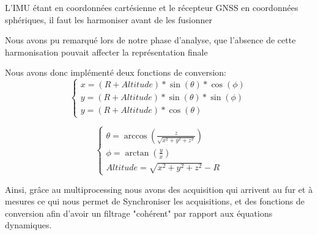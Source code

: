 L'IMU étant en coordonnées cartésienne et le récepteur GNSS en coordonnées sphériques, il faut les harmoniser avant de les fusionner

Nous avons pu remarqué lors de notre phase d'analyse, que l'absence de cette harmonisation pouvait affecter la représentation finale

Nous avons donc implémenté deux fonctions de conversion:
\[
\left\{
\begin{array}{l}
    x = (R + Altitude) * \sin(\theta) * \cos(\phi) \\
    y = (R + Altitude) * \sin(\theta) * \sin(\phi) \\
    y = (R + Altitude) * \cos(\theta)
\end{array}
\right.
\]

\[
\left\{
\begin{array}{l}
    \theta = \arccos(\frac{z}{\sqrt{x^2 + y^2 +z^2}}) \\
    \phi = \arctan(\frac{y}{x}) \\
    Altitude = \sqrt{x^2 + y^2 +z^2} - R
\end{array}
\right.
\]

Ainsi, grâce au multiprocessing nous avons des acquisition qui arrivent au fur et à mesures ce qui nous permet de Synchroniser les acquisitions,
et des fonctions de conversion afin d'avoir un filtrage "cohérent" par rapport aux équations dynamiques.